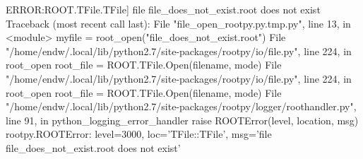 \begin{footnotesize}
\begin{pyglist}[language=text,texcl=true,abovecaptionskip=0,style=bw]
ERROR:ROOT.TFile.TFile] file file_does_not_exist.root does not exist
Traceback (most recent call last):
  File "file_open_rootpy.py.tmp.py", line 13, in <module>
    myfile = root_open("file_does_not_exist.root")
  File "/home/endw/.local/lib/python2.7/site-packages/rootpy/io/file.py", line 224, in root_open
    root_file = ROOT.TFile.Open(filename, mode)
  File "/home/endw/.local/lib/python2.7/site-packages/rootpy/io/file.py", line 224, in root_open
    root_file = ROOT.TFile.Open(filename, mode)
  File "/home/endw/.local/lib/python2.7/site-packages/rootpy/logger/roothandler.py", line 91, in python_logging_error_handler
    raise ROOTError(level, location, msg)
rootpy.ROOTError: level=3000, loc='TFile::TFile', msg='file file_does_not_exist.root does not exist'
\end{pyglist}
\end{footnotesize}
